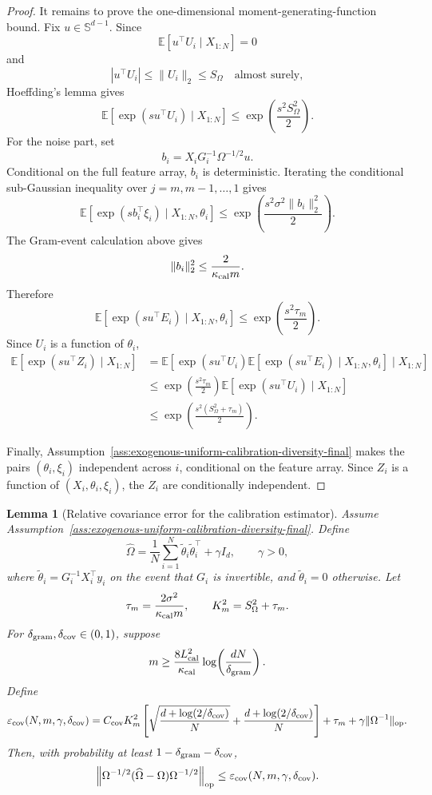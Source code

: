 \documentclass{article} %
\newtheorem{lemma}[theorem]{Lemma}
\begin{document}
\begin{proof}
It remains to prove the one-dimensional moment-generating-function bound.
Fix \(u\in\mathbb{S}^{d-1}\).  Since
\[
\mathbb{E}[u^\top U_i\mid X_{1:N}]=0
\]
and
\[
|u^\top U_i|\le \|U_i\|_2\le S_\Omega
\quad\text{almost surely},
\]
Hoeffding's lemma gives
\[
\mathbb{E}\!\left[
\exp(su^\top U_i)\mid X_{1:N}
\right]
\le
\exp\!\left(\frac{s^2S_\Omega^2}{2}\right).
\]
For the noise part, set
\[
b_i=X_iG_i^{-1}\Omega^{-1/2}u.
\]
Conditional on the full feature array, \(b_i\) is deterministic.  Iterating the
conditional sub-Gaussian inequality over \(j=m,m-1,\ldots,1\) gives
\[
\mathbb{E}\!\left[
\exp(sb_i^\top\xi_i)
\mid X_{1:N},\theta_i
\right]
\le
\exp\!\left(\frac{s^2\sigma^2\|b_i\|_2^2}{2}\right).
\]
The Gram-event calculation above gives
\[
\|b_i\|_2^2\le \frac{2}{\kappa_{\rm cal}m}.
\]
Therefore
\[
\mathbb{E}\!\left[
\exp(su^\top E_i)
\mid X_{1:N},\theta_i
\right]
\le
\exp\!\left(\frac{s^2\tau_m}{2}\right).
\]
Since \(U_i\) is a function of \(\theta_i\),
\[
\begin{aligned}
\mathbb{E}\!\left[
\exp(su^\top Z_i)\mid X_{1:N}
\right]
&=
\mathbb{E}\!\left[
\exp(su^\top U_i)
\mathbb{E}\!\left[
\exp(su^\top E_i)
\mid X_{1:N},\theta_i
\right]
\mid X_{1:N}
\right]
\\
&\le
\exp\!\left(\frac{s^2\tau_m}{2}\right)
\mathbb{E}\!\left[
\exp(su^\top U_i)\mid X_{1:N}
\right]
\\
&\le
\exp\!\left(\frac{s^2(S_\Omega^2+\tau_m)}{2}\right).
\end{aligned}
\]

Finally, Assumption~\ref{ass:exogenous-uniform-calibration-diversity-final}
makes the pairs \((\theta_i,\xi_i)\) independent across \(i\), conditional on
the feature array. Since \(Z_i\) is a function of
\((X_i,\theta_i,\xi_i)\), the \(Z_i\) are conditionally independent.
\end{proof}

\begin{lemma}[Relative covariance error for the calibration estimator]
\label{lem:relative-covariance-error-final}
Assume Assumption~\ref{ass:exogenous-uniform-calibration-diversity-final}.
Define
\[
\widehat\Omega
=
\frac1N\sum_{i=1}^N \widetilde\theta_i\widetilde\theta_i^\top+\gamma I_d,
\qquad
\gamma>0,
\]
where \(\widetilde\theta_i=G_i^{-1}X_i^\top y_i\) on the event that \(G_i\) is
invertible, and \(\widetilde\theta_i=0\) otherwise.  Let
\[
\tau_m=\frac{2\sigma^2}{\kappa_{\rm cal}m},
\qquad
K_m^2=S_\Omega^2+\tau_m.
\]
For
\(\delta_{\rm gram},\delta_{\rm cov}\in(0,1)\), suppose
\[
m
\ge
\frac{8L_{\rm cal}^2}{\kappa_{\rm cal}}
\log\!\left(\frac{dN}{\delta_{\rm gram}}\right).
\]
Define
\[
\varepsilon_{\rm cov}(N,m,\gamma,\delta_{\rm cov})
=
C_{\rm cov}K_m^2
\left[
\sqrt{\frac{d+\log(2/\delta_{\rm cov})}{N}}
+
\frac{d+\log(2/\delta_{\rm cov})}{N}
\right]
+
\tau_m
+
\gamma\|\Omega^{-1}\|_{\mathrm{op}}.
\]
Then, with probability at least \(1-\delta_{\rm gram}-\delta_{\rm cov}\),
\[
\left\|
\Omega^{-1/2}(\widehat\Omega-\Omega)\Omega^{-1/2}
\right\|_{\mathrm{op}}
\le
\varepsilon_{\rm cov}(N,m,\gamma,\delta_{\rm cov}).
\]
\end{lemma}
\end{document}
